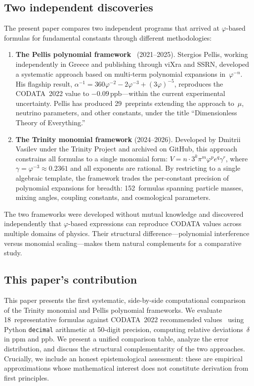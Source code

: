 \documentclass[11pt,a4paper]{article}
\newcommand{\vp}{\varphi}
\newcommand{\ppb}{\,\mathrm{ppb}}
\begin{document}
\subsection*{Two independent discoveries}

The present paper compares two independent programs that arrived at
$\vp$-based formulas for fundamental constants through different methodologies:

\begin{enumerate}[leftmargin=*]
\item \textbf{The Pellis polynomial framework}~\cite{pellis2021alpha,pellis2023toe}
(2021--2025). Stergios Pellis, working independently in Greece and publishing
through viXra and SSRN, developed a systematic approach based on multi-term
polynomial expansions in~$\vp^{-n}$. His flagship result,
$\alpha^{-1}=360\vp^{-2}-2\vp^{-3}+(3\vp)^{-5}$, reproduces the CODATA~2022
value to $-0.09\ppb$---within the current experimental uncertainty.
Pellis has produced 29~preprints extending the approach to~$\mu$, neutrino
parameters, and other constants, under the title ``Dimensionless Theory of
Everything.''

\item \textbf{The Trinity monomial framework} (2024--2026). Developed by
Dmitrii Vasilev under the Trinity Project and archived on GitHub, this approach
constrains all formulas to a single monomial form:
$V = n\cdot 3^{k}\pi^{m}\vp^{p}e^{q}\gamma^{r}$, where
$\gamma=\vp^{-3}\approx 0.2361$ and all exponents are rational. By restricting
to a single algebraic template, the framework trades the per-constant precision
of polynomial expansions for breadth: 152~formulas spanning particle masses,
mixing angles, coupling constants, and cosmological parameters.
\end{enumerate}

The two frameworks were developed without mutual knowledge and discovered
independently that $\vp$-based expressions can reproduce CODATA values across
multiple domains of physics. Their structural difference---polynomial
interference versus monomial scaling---makes them natural complements for a
comparative study.

\subsection*{This paper's contribution}

This paper presents the first systematic, side-by-side computational comparison
of the Trinity monomial and Pellis polynomial frameworks. We evaluate
18~representative formulas against CODATA~2022 recommended
values~\cite{codata2022} using Python \texttt{decimal} arithmetic at
50-digit precision, computing relative deviations~$\delta$ in ppm and ppb. We
present a unified comparison table, analyze the error distribution, and discuss
the structural complementarity of the two approaches. Crucially, we include an
honest epistemological assessment: these are empirical approximations whose
mathematical interest does not constitute derivation from first principles.
\end{document}
